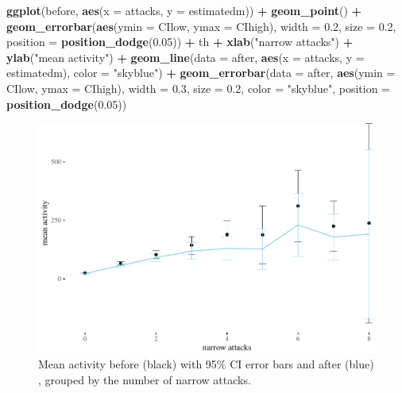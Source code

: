 \documentclass[10pt,]{scrartcl}
\newenvironment{Shaded}{\begin{snugshade}}{\end{snugshade}}
\newcommand{\KeywordTok}[1]{\textcolor[rgb]{0.13,0.29,0.53}{\textbf{#1}}}
\newcommand{\DataTypeTok}[1]{\textcolor[rgb]{0.13,0.29,0.53}{#1}}
\newcommand{\FloatTok}[1]{\textcolor[rgb]{0.00,0.00,0.81}{#1}}
\newcommand{\StringTok}[1]{\textcolor[rgb]{0.31,0.60,0.02}{#1}}
\newcommand{\OperatorTok}[1]{\textcolor[rgb]{0.81,0.36,0.00}{\textbf{#1}}}
\newcommand{\NormalTok}[1]{#1}
\begin{document}
\begin{Shaded}
\begin{Highlighting}[]
\KeywordTok{ggplot}\NormalTok{(before, }\KeywordTok{aes}\NormalTok{(}\DataTypeTok{x =}\NormalTok{ attacks, }\DataTypeTok{y =}\NormalTok{ estimatedm)) }\OperatorTok{+}\StringTok{ }\KeywordTok{geom_point}\NormalTok{() }\OperatorTok{+}
\StringTok{    }\KeywordTok{geom_errorbar}\NormalTok{(}\KeywordTok{aes}\NormalTok{(}\DataTypeTok{ymin =}\NormalTok{ CIlow, }\DataTypeTok{ymax =}\NormalTok{ CIhigh), }\DataTypeTok{width =} \FloatTok{0.2}\NormalTok{,}
        \DataTypeTok{size =} \FloatTok{0.2}\NormalTok{, }\DataTypeTok{position =} \KeywordTok{position_dodge}\NormalTok{(}\FloatTok{0.05}\NormalTok{)) }\OperatorTok{+}\StringTok{ }\NormalTok{th }\OperatorTok{+}\StringTok{ }\KeywordTok{xlab}\NormalTok{(}\StringTok{"narrow attacks"}\NormalTok{) }\OperatorTok{+}
\StringTok{    }\KeywordTok{ylab}\NormalTok{(}\StringTok{"mean activity"}\NormalTok{) }\OperatorTok{+}\StringTok{ }\KeywordTok{geom_line}\NormalTok{(}\DataTypeTok{data =}\NormalTok{ after, }\KeywordTok{aes}\NormalTok{(}\DataTypeTok{x =}\NormalTok{ attacks,}
    \DataTypeTok{y =}\NormalTok{ estimatedm), }\DataTypeTok{color =} \StringTok{"skyblue"}\NormalTok{) }\OperatorTok{+}\StringTok{ }\KeywordTok{geom_errorbar}\NormalTok{(}\DataTypeTok{data =}\NormalTok{ after,}
    \KeywordTok{aes}\NormalTok{(}\DataTypeTok{ymin =}\NormalTok{ CIlow, }\DataTypeTok{ymax =}\NormalTok{ CIhigh), }\DataTypeTok{width =} \FloatTok{0.3}\NormalTok{, }\DataTypeTok{size =} \FloatTok{0.2}\NormalTok{,}
    \DataTypeTok{color =} \StringTok{"skyblue"}\NormalTok{, }\DataTypeTok{position =} \KeywordTok{position_dodge}\NormalTok{(}\FloatTok{0.05}\NormalTok{))}
\end{Highlighting}
\end{Shaded}

\normalsize

\begin{figure}

\begin{center}\includegraphics[width=1\linewidth]{redditAnalysisWalkthrough_files/figure-latex/unnamed-chunk-110-1} \end{center}
\caption{Mean activity before (black) with 95\% CI error bars and after (blue) , grouped by the number of narrow attacks.}
\end{figure}
\end{document}
